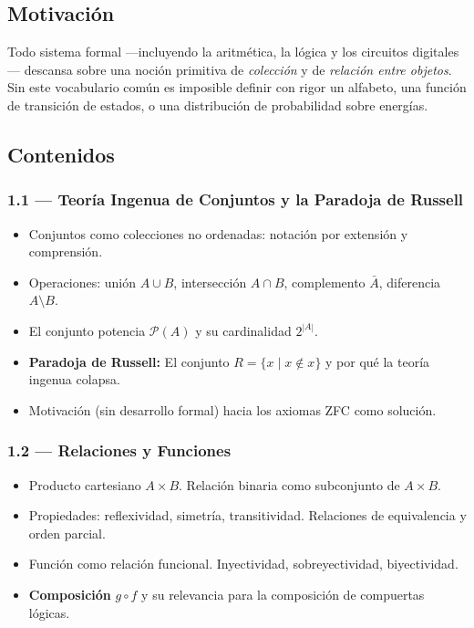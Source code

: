 \documentclass[11pt, letterpaper]{article}
\begin{document}
\subsection*{Motivación}
Todo sistema formal —incluyendo la aritmética, la lógica y los circuitos digitales— descansa sobre una noción primitiva de \emph{colección} y de \emph{relación entre objetos}. Sin este vocabulario común es imposible definir con rigor un alfabeto, una función de transición de estados, o una distribución de probabilidad sobre energías.

\subsection{Contenidos}

\subsubsection{1.1 — Teoría Ingenua de Conjuntos y la Paradoja de Russell}
\begin{itemize}
  \item Conjuntos como colecciones no ordenadas: notación por extensión y comprensión.
  \item Operaciones: unión $A\cup B$, intersección $A\cap B$, complemento $\bar{A}$, diferencia $A\setminus B$.
  \item El conjunto potencia $\mathcal{P}(A)$ y su cardinalidad $2^{|A|}$.
  \item \textbf{Paradoja de Russell:} El conjunto $R=\{x \mid x\notin x\}$ y por qué la teoría ingenua colapsa.
  \item Motivación (sin desarrollo formal) hacia los axiomas ZFC como solución.
\end{itemize}

\subsubsection{1.2 — Relaciones y Funciones}
\begin{itemize}
  \item Producto cartesiano $A\times B$. Relación binaria como subconjunto de $A\times B$.
  \item Propiedades: reflexividad, simetría, transitividad. Relaciones de equivalencia y orden parcial.
  \item Función como relación funcional. Inyectividad, sobreyectividad, biyectividad.
  \item \textbf{Composición} $g\circ f$ y su relevancia para la composición de compuertas lógicas.
\end{itemize}
\end{document}
